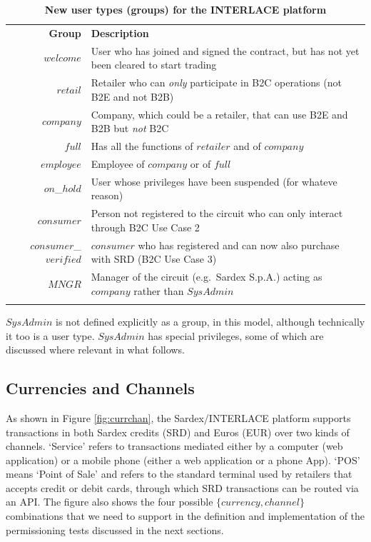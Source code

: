 \setlength{\tabcolsep}{10pt}
\begin{table}[h]
\begin{centering}
\small
{
\begin{tabular}{ r | l  }
\hline
\textbf{Group}	& \textbf{Description} \\
\Xhline{1.5pt}
$welcome$ & User who has joined and signed the contract, but has not yet been cleared to start trading \\
\hline
$retail$ & Retailer who can \emph{only} participate in B2C operations (not B2E and not B2B) \\
\hline
$company$ & Company, which could be a retailer, that can use B2E and B2B but \emph{not} B2C \\
\hline
$full$ & Has all the functions of $retailer$ and of $company$ \\
\hline
$employee$ & Employee of $company$ or of $full$ \\
\hline
$on$\_$hold$ & User whose privileges have been suspended (for whateve reason) \\
\hline
$consumer$ & Person not registered to the circuit who can only interact through B2C Use Case 2 \\
\hline
$consumer$\_$verified$ & $consumer$ who has registered and can now also purchase with SRD (B2C Use Case 3)  \\
\hline
$MNGR$ & Manager of the circuit (e.g.\ Sardex S.p.A.) acting as $company$ rather than $SysAdmin$ \\
\Xhline{1.5pt}
\end{tabular}
}
\caption{\small\textbf{New user types (groups) for the INTERLACE platform}}
\label{tab:groups}
\end{centering}
\end{table}
\vspace{-0.5cm}

$SysAdmin$ is not defined explicitly as a group, in this model, although technically it too is a user type. $SysAdmin$ has special privileges, some of which are discussed where relevant in what follows.

\subsection{Currencies and Channels}
As shown in Figure \ref{fig:currchan}, the Sardex/INTERLACE platform supports transactions in both Sardex credits (SRD) and Euros (EUR) over two kinds of channels. `Service' refers to transactions mediated either by a computer (web application) or a mobile phone (either a web application or a phone App). `POS' means `Point of Sale' and refers to the standard terminal used by retailers that accepts credit or debit cards, through which SRD transactions can be routed via an API. The figure also shows the four possible $\{ currency, channel \}$ combinations that we need to support in the definition and implementation of the permissioning tests discussed in the next sections.

